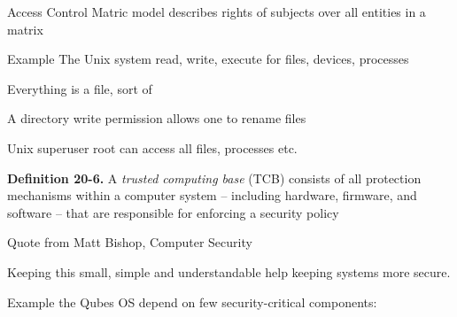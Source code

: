 \documentclass[Screen16to9,17pt]{foils}
\begin{document}

\begin{list1}
\item Access Control Matric model describes rights of subjects over all entities in a matrix
\item Example The Unix system read, write, execute for files, devices, processes
\item Everything is a file, sort of
\item A directory write permission allows one to rename files
\item Unix superuser root can access all files, processes etc.
\end{list1}




{\bf Definition 20-6.} A \emph{trusted computing base} (TCB) consists of all protection mechanisms within a computer system -- including hardware, firmware, and software -- that are responsible for enforcing a security policy

Quote from Matt Bishop, Computer Security

Keeping this small, simple and understandable help keeping systems more secure.

Example the Qubes OS depend on few security-critical components:\\





\slidenext
\end{document}
